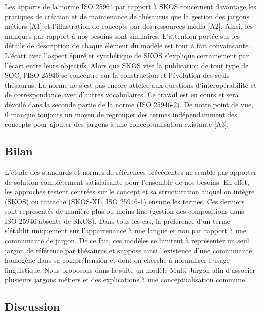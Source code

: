 Les apports de la norme ISO 25964 par rapport à SKOS concernent davantage les pratiques de création et de maintenance de thésaurus que la gestion des jargons métiers [A1] et l'illustration de concepts par des ressources média [A2]. 
Ainsi, les manques par rapport à nos besoins sont similaires. L'attention portée sur les détails de description de chaque élément du modèle est tout à fait convaincante. 
L'écart avec l'aspect épuré et synthétique de SKOS s'explique certainement par l'écart entre leurs objectifs. 
Alors que SKOS vise la publication de tout type de SOC, l'ISO 25946 se concentre sur la construction et l'évolution des seuls thésaurus. 
La norme ne s'est pas encore attelée aux questions d'interopérabilité et de correspondance avec d'autres vocabulaires. Ce travail est en cours et sera dévoilé dans la seconde partie de la norme (ISO 25946-2). 
De notre point de vue, il manque toujours un moyen de regrouper des termes indépendamment des concepts pour ajouter des jargons à une conceptualisation existante [A3].


\subsection*{Bilan}
L'étude des standards et normes de références précédentes ne semble pas apporter de solution complètement satisfaisante pour l'ensemble de nos besoins. 
En effet, les approches restent centrées sur le concept et sa structuration auquel on intègre (SKOS) ou rattache (SKOS-XL, ISO 25946-1) ensuite les termes. 
Ces derniers sont représentés de manière plus ou moins fine (gestion des compositions dans ISO 25946 absente de SKOS). 
Dans tous les cas, la préférence d'un terme s'établit uniquement sur l'appartenance à une langue et non par rapport à une communauté de jargon. %
De ce fait, ces modèles se limitent à représenter un seul jargon de référence par thésaurus et suppose ainsi l'existence d'une communauté homogène dans sa compréhension et dont on cherche à normaliser l'usage linguistique. %
Nous proposons dans la suite un modèle Multi-Jargon afin d'associer plusieurs jargons métiers et des explications à une conceptualisation commune. %


\subsection*{Discussion}
